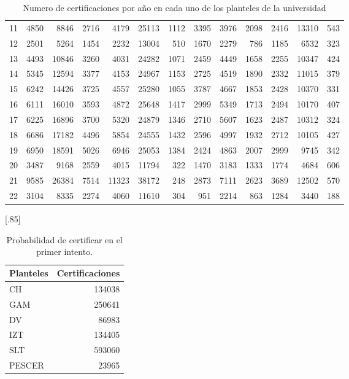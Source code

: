 \documentclass[12pt]{article}
\begin{document}
\begin{table}[ht]
{\begin{tabular}{||c||rrrrrr||rrrrrr||}
  11 & 4850 & 8846 & 2716 & 4179& 25113 &  1112& 3395 & 3976 & 2098 & 2416 &13310  &  543\\
  12 & 2501 & 5264 & 1454 & 2232& 13004  &  510& 1670 & 2279 &  786 & 1185 & 6532  &  323\\
  13 & 4493 &10846 & 3260 & 4031& 24282  & 1071& 2459 & 4449 & 1658 & 2255 &10347  &  424\\
  14 & 5345 &12594 & 3377 & 4153& 24967  & 1153& 2725 & 4519 & 1890 & 2332 &11015  &  379\\
  15 & 6242 &14426 & 3725 & 4557& 25280  & 1055& 3787 & 4667 & 1853 & 2428 &10370  &  331\\
  16 & 6111 &16010 & 3593 & 4872& 25648  & 1417& 2999 & 5349 & 1713 & 2494 &10170  &  407\\
  17 & 6225 &16896 & 3700 & 5320& 24879  & 1346& 2710 & 5607 & 1623 & 2487 &10312  &  324\\
  18 & 6686 &17182 & 4496 & 5854& 24555  & 1432& 2596 & 4997 & 1932 & 2712 &10105  &  427\\
  19 & 6950 &18591 & 5026 & 6946& 25053  & 1384& 2424 & 4863 & 2007 & 2999 & 9745  &  342\\
  20 & 3487 & 9168 & 2559 & 4015& 11794  &  322& 1470 & 3183 & 1333 & 1774 & 4684  &  606\\
  21 & 9585 &26384 & 7514 &11323& 38172  &  248& 2873 & 7111 & 2623 & 3689 &12502  &  570\\
  22 & 3104 & 8335 & 2274 & 4060& 11610  &  304&  951 & 2214 &  863 & 1284 & 3440  &  188\\\hline\hline
\end{tabular}}
\caption{Numero de certificaciones por a\~no en cada uno de los planteles de la universidad}
\label{Tabla_Certificaciones_Plantel_Anho}
\end{table}



\begin{table}[ht!]
\centering
\scalebox{0.75}[.85]{
\begin{tabular}{lr}
  \hline
 Planteles& Certificaciones \\ 
  \hline
CH & 134038 \\ 
  GAM & 250641 \\ 
  DV & 86983 \\ 
  IZT & 134405 \\ 
  SLT & 593060 \\ 
  PESCER & 23965 \\ 
   \hline
\end{tabular}
}
\caption{\label{Prob_Cert_Intento_1}Probabilidad de certificar en el primer intento.}
\end{table}
\end{document}
